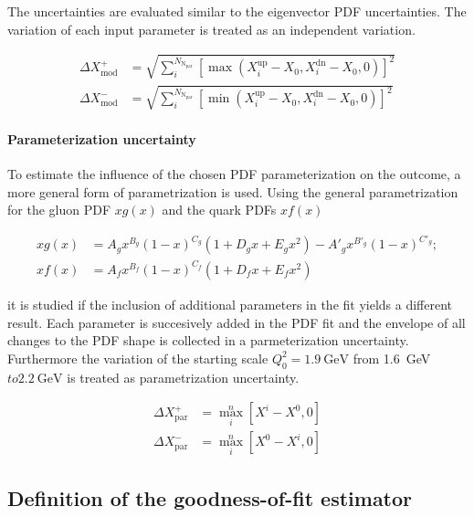 The uncertainties are evaluated similar to the eigenvector PDF uncertainties.
The variation of each input parameter is treated as an independent variation.

\begin{align*}
  \Delta X^+_{\mathrm{mod}} &= \sqrt{\sum_i^{N_{\mathrm{N_{\mathrm{par}}}}} \left[ \max(X_i^{\mathrm{up}}
    -X_0, X_i^{\mathrm{dn}} - X_0, 0)\right]^2}\\
    \Delta X^-_{\mathrm{mod}} &= \sqrt{\sum_i^{N_{\mathrm{N_{\mathrm{par}}}}} \left[ \min(X_i^{\mathrm{up}} - X_0, X_i^{\mathrm{dn}} - X_0,0)\right]^2}
\end{align*}

\paragraph{Parameterization uncertainty}

To estimate the influence of the chosen PDF parameterization on the outcome, a
more general form of parametrization is used. Using the general parametrization
for the gluon PDF $xg(x)$ and the quark PDFs $xf(x)$

\begin{align}
   xg(x) &= A_g x^{B_g} (1-x)^{C_g} (1  + D_g x + E_g x^2) - A'_g x^{B'_g} (1-x)^{C'_g};\\
   xf(x) &= A_{f}  x^{B_{f}} (1-x)^{C_{f}} (1 + D_{f}x + E_{f}x^2)
\end{align}

it is studied if the inclusion of additional parameters in the fit yields a
different result. Each parameter is succesively added in the PDF fit and the
envelope of all changes to the PDF shape is collected in a parmeterization
uncertainty. Furthermore the variation of the starting scale $Q_0^2 =
\SI{1.9}{\GeV}$ from \SI{1.6}{\GeV}$ to \SI{2.2}{\GeV}$ is treated as
parametrization uncertainty.

\begin{align*}
  \Delta X^+_{\mathrm{par}} &= \max_{i}^{n} \left[ X^i - X^0, 0 \right]\\
  \Delta X^-_{\mathrm{par}} &= \max_{i}^{n} \left[ X^0 - X^i, 0 \right]
\end{align*}


\subsection{Definition of the goodness-of-fit estimator}
\label{sec:chi2_definition}




